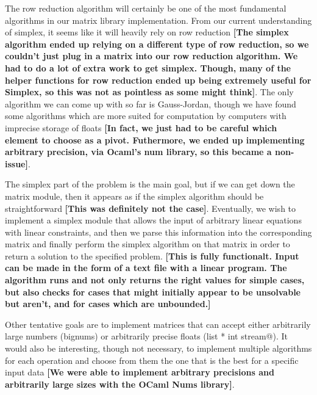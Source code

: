 \documentclass[letterpaper,11pt]{article}
\newcommand{\annot}[1]{\textbf{\color{BrickRed} [#1]}}
\begin{document}
The row reduction algorithm will certainly be one of the most fundamental
algorithms in our matrix library implementation. From our current understanding
of simplex, it seems like it will heavily rely on row reduction {\annot{The
simplex algorithm ended up relying on a different type of row reduction, so we
couldn't just plug in a matrix into our row reduction algorithm. We had to do a
lot of extra work to get simplex. Though, many of the helper functions for row
reduction ended up being extremely useful for Simplex, so this was not as
pointless as some might think}}. The only algorithm we can come up with so far
is Gauss-Jordan, though we have found some algorithms which are more suited for
computation by computers with imprecise storage of floats {\annot{In fact, we
just had to be careful which element to choose as a pivot. Futhermore, we ended
up implementing arbitrary precision, via Ocaml's num library,  so this became a
non-issue}}.

The simplex part of the problem is the main goal, but if we can get down the
matrix module, then it appears as if the simplex algorithm should be
straightforward {\annot{This was definitely not the case}}. Eventually, we wish
to implement a simplex module that allows the input of arbitrary linear
equations with linear constraints, and then we parse this information into the
corresponding matrix and finally perform the simplex algorithm on that matrix in
order to return a solution to the specified problem.{\annot{This is fully functionalt.
Input can be made in the form of a text file with a linear program. The algorithm
runs and not only returns the right values for simple cases, but also checks for
cases that might initially appear to be unsolvable but aren't, and for cases which
are unbounded.}}

Other tentative goals are to implement matrices that can accept either
arbitrarily large numbers (bignums) or arbitrarily precise floats 
(\verb@int list * int stream@). It would also be interesting, though not
necessary, to implement multiple algorithms for each operation and choose from
them the one that is the best for a specific input data {\annot{We were able to
implement arbitrary precisions and arbitrarily large sizes with the OCaml Nums
library}}.
\end{document}
